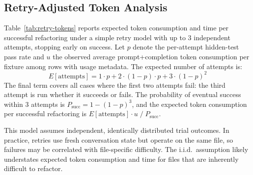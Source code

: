 \documentclass[11pt,letterpaper]{article}
\begin{document}
\subsection{Retry-Adjusted Token Analysis}

Table~\ref{tab:retry-tokens} reports expected token consumption and time per successful refactoring under a simple retry model with up to 3 independent attempts, stopping early on success. Let $p$ denote the per-attempt hidden-test pass rate and $u$ the observed average prompt+completion token consumption per fixture among rows with usage metadata. The expected number of attempts is:
\[
E[\text{attempts}] = 1 \cdot p + 2 \cdot (1{-}p) \cdot p + 3 \cdot (1{-}p)^2
\]
The final term covers all cases where the first two attempts fail: the third attempt is run whether it succeeds or fails. The probability of eventual success within 3 attempts is $P_{\text{succ}} = 1 - (1{-}p)^3$, and the expected token consumption per successful refactoring is $E[\text{attempts}] \cdot u \;/\; P_{\text{succ}}$.

This model assumes independent, identically distributed trial outcomes. In practice, retries use fresh conversation state but operate on the same file, so failures may be correlated with file-specific difficulty. The i.i.d.\ assumption likely understates expected token consumption and time for files that are inherently difficult to refactor.
\end{document}
